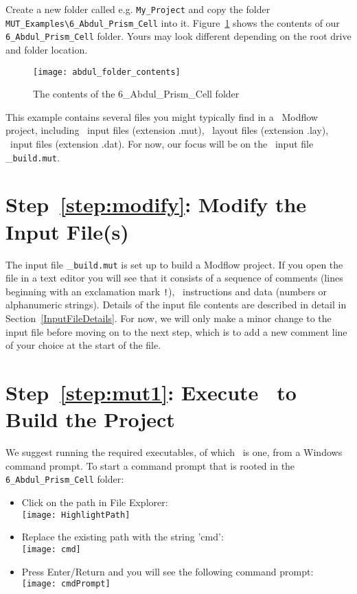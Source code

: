 Create a new folder called e.g. \verb+My_Project+ and copy the folder \verb+MUT_Examples\6_Abdul_Prism_Cell+ into it.
Figure~\ref{fig:my_project} shows the contents of our \verb+6_Abdul_Prism_Cell+ folder.  Yours may look different depending on the root drive and folder location.
\begin{figure}[h!]
    \centering
    \texttt{[image: abdul\_folder\_contents]}
    \caption{The contents of the 6\_Abdul\_Prism\_Cell folder}
    \label{fig:my_project}
\end{figure}

This example contains several files you might typically find in a \mut\ Modflow project, including \mut\ input files (extension .mut), \tecplot\ layout files (extension .lay), \tecplot\ input files (extension .dat).  For now, our focus will be on the \mut\ input file \_\verb+build.mut+.

\section*{Step~\ref{step:modify}: Modify the Input File(s)}
The input file \_\verb+build.mut+ is set up to build a Modflow project.  If you open the file in a text editor you will see that it consists of a sequence of comments (lines beginning with an exclamation mark \verb+!+), \mut\ instructions and data (numbers or alphanumeric strings).  Details of the input file contents are described in detail in Section~\ref{InputFileDetails}.  For now, we will only make a minor change to the input file before moving on to the next step, which is to add a new comment line of your choice at the start of the file.

\section*{Step~\ref{step:mut1}: Execute \mut\ to Build the Project}
We suggest running the required executables, of which \mut\ is one, from a Windows command prompt.  To start a command prompt that is rooted in the \verb+6_Abdul_Prism_Cell+ folder:
\begin{itemize}
    \item  Click on the path in File Explorer: \\
        \texttt{[image: HighlightPath]} \\
    \item  Replace the existing path with the string 'cmd': \\
        \texttt{[image: cmd]}\\
    \item Press Enter/Return and you will see the following command prompt: \\
        \texttt{[image: cmdPrompt]}\\
\end{itemize}

